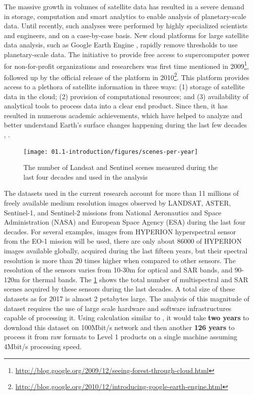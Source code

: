 The massive growth in volumes of satellite data has resulted in a severe demand in storage, computation and smart analytics to enable analysis of planetary-scale data. Until recently, such analyses were performed by highly specialized scientists and engineers, and on a case-by-case basis. New cloud platforms for large satellite data analysis, such as Google Earth Engine \citep{Gorelick2012}, rapidly remove thresholds to use planetary-scale data. The initiative to provide free access to supercomputer power for non-for-profit organizations and researchers was first time mentioned in 2009\footnote{\url{http://blog.google.org/2009/12/seeing-forest-through-cloud.html}}, followed up by the official release of the platform in 2010\footnote{\url{http://blog.google.org/2010/12/introducing-google-earth-engine.html}}. This platform provides access to a plethora of satellite information in three ways: (1) storage of satellite data in the cloud; (2) provision of computational resources; and (3) availability of analytical tools to process data into a clear end product. Since then, it has resulted in numerous academic achievements, which have helped to analyze and better understand Earth's surface changes happening during the last few decades \citep{Hansen2013}, \citep{pekel2016high}.

\begin{figure}
	\centering
	\texttt{[image: 01.1-introduction/figures/scenes-per-year]}
	\caption{The number of Landsat and Sentinel scenes measured during the last four decades and used in the analysis}
	\label{fig:sensor-count}
\end{figure}

The datasets used in the current research account for more than 11 millions of freely available medium resolution images observed by LANDSAT, ASTER, Sentinel-1, and Sentinel-2 missions from National Aeronautics and Space Administration (NASA) and European Space Agency (ESA) during the last four decades. For several examples, images from HYPERION hyperspectral sensor from the EO-1 mission will be used, there are only about 86000 of HYPERION images available globally, acquired during the last fifteen years, but their spectral resolution is more than 20 times higher when compared to other sensors. The resolution of the sensors varies from 10-30m for optical and SAR bands, and 90-120m for thermal bands. The \ref{fig:sensor-count} shows the total number of multispectral and SAR scenes acquired by these sensors during the last decades. A total size of these datasets as for 2017 is almost 2 petabytes large. The analysis of this magnitude of dataset requires the use of large scale hardware and software infrastructures capable of processing it. Using calculation similar to \citep{wagner2015big}, it would take \textbf{two years} to download this dataset on 100Mbit/s network and then another \textbf{126 years} to process it from raw formats to Level 1 products on a single machine assuming 4Mbit/s processing speed.

